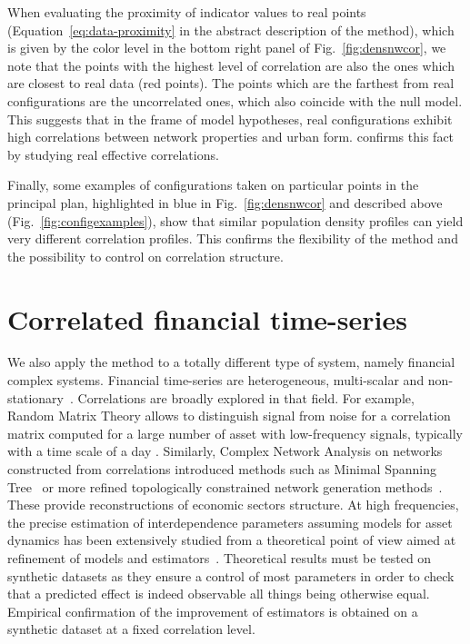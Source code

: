 \documentclass{bmcart}
\begin{document}
When evaluating the proximity of indicator values to real points (Equation~\ref{eq:data-proximity} in the abstract description of the method), which is given by the color level in the bottom right panel of Fig.~\ref{fig:densnwcor}, we note that the points with the highest level of correlation are also the ones which are closest to real data (red points). The points which are the farthest from real configurations are the uncorrelated ones, which also coincide with the null model. This suggests that in the frame of model hypotheses, real configurations exhibit high correlations between network properties and urban form. \cite{raimbault2019urban} confirms this fact by studying real effective correlations.

Finally, some examples of configurations taken on particular points in the principal plan, highlighted in blue in Fig.~\ref{fig:densnwcor} and described above (Fig.~\ref{fig:configexamples}), show that similar population density profiles can yield very different correlation profiles. This confirms the flexibility of the method and the possibility to control on correlation structure.





\section*{Correlated financial time-series}



We also apply the method to a totally different type of system, namely financial complex systems. Financial time-series are heterogeneous, multi-scalar and non-stationary~\cite{mantegna2000introduction}. Correlations are broadly explored in that field. For example, Random Matrix Theory allows to distinguish signal from noise for a correlation matrix computed for a large number of asset with low-frequency signals, typically with a time scale of a day \cite{2009arXiv0910.1205B}. Similarly, Complex Network Analysis on networks constructed from correlations introduced methods such as Minimal Spanning Tree~\cite{2001PhyA..299...16B} or more refined topologically constrained network generation methods~\cite{tumminello2005tool}. These provide reconstructions of economic sectors structure. At high frequencies, the precise estimation of interdependence parameters assuming models for asset dynamics has been extensively studied from a theoretical point of view aimed at refinement of models and estimators~\cite{barndorff2011multivariate}. Theoretical results must be tested on synthetic datasets as they ensure a control of most parameters in order to check that a predicted effect is indeed observable all things being otherwise equal. Empirical confirmation of the improvement of estimators is obtained on a synthetic dataset at a fixed correlation level.
\end{document}
